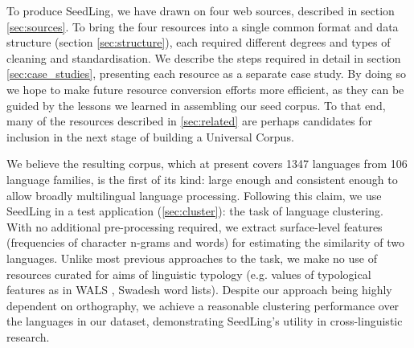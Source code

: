 To produce SeedLing, we have drawn on four web sources, described in section \ref{sec:sources}. To bring the four resources into a single common format and data structure (section \ref{sec:structure}), each required different degrees and types of cleaning and standardisation. We describe the steps required in detail in section \ref{sec:case_studies}, presenting each resource as a separate case study. By doing so we hope to make future resource conversion efforts more efficient, as they can be guided by the lessons we learned in assembling our seed corpus. To that end, many of the resources described in \ref{sec:related} are perhaps candidates for inclusion in the next stage of building a Universal Corpus.

We believe the resulting corpus, which at present covers 1347 languages from 106 language families, is the first of its kind: large enough and consistent enough to allow broadly multilingual language processing. Following this claim, we use SeedLing in a test application (\ref{sec:cluster}): the task of language clustering. With no additional pre-processing required, we extract surface-level features (frequencies of character n-grams and words) for estimating the similarity of two languages. Unlike most previous approaches to the task, we make no use of resources curated for aims of linguistic typology (e.g. values of typological features as in WALS \cite{wals}, Swadesh word lists). Despite our approach being highly dependent on orthography, we achieve a reasonable clustering performance over the languages in our dataset, demonstrating SeedLing's utility in cross-linguistic research.





